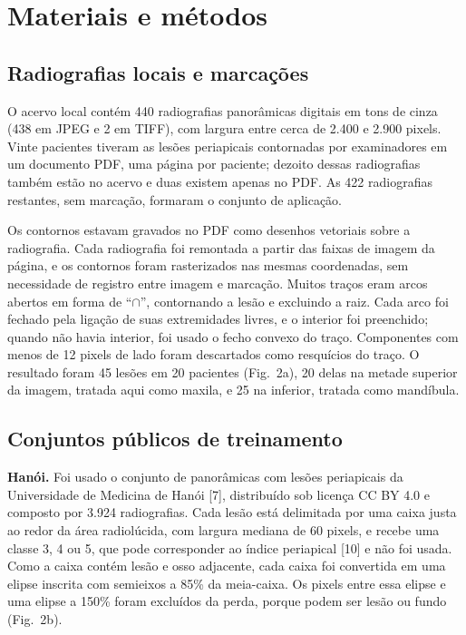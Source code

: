 \documentclass[twocolumn]{article}
\begin{document}

\section{Materiais e métodos}

\subsection{Radiografias locais e marcações}

O acervo local contém 440 radiografias panorâmicas digitais em tons de cinza (438 em JPEG e 2 em TIFF), com largura entre cerca de 2.400 e 2.900 pixels. Vinte pacientes tiveram as lesões periapicais contornadas por examinadores em um documento PDF, uma página por paciente; dezoito dessas radiografias também estão no acervo e duas existem apenas no PDF. As 422 radiografias restantes, sem marcação, formaram o conjunto de aplicação.

Os contornos estavam gravados no PDF como desenhos vetoriais sobre a radiografia. Cada radiografia foi remontada a partir das faixas de imagem da página, e os contornos foram rasterizados nas mesmas coordenadas, sem necessidade de registro entre imagem e marcação. Muitos traços eram arcos abertos em forma de ``$\cap$'', contornando a lesão e excluindo a raiz. Cada arco foi fechado pela ligação de suas extremidades livres, e o interior foi preenchido; quando não havia interior, foi usado o fecho convexo do traço. Componentes com menos de 12 pixels de lado foram descartados como resquícios do traço. O resultado foram 45 lesões em 20 pacientes (Fig.~2a), 20 delas na metade superior da imagem, tratada aqui como maxila, e 25 na inferior, tratada como mandíbula.

\subsection{Conjuntos públicos de treinamento}

\textbf{Hanói.} Foi usado o conjunto de panorâmicas com lesões periapicais da Universidade de Medicina de Hanói [7], distribuído sob licença CC BY 4.0 e composto por 3.924 radiografias. Cada lesão está delimitada por uma caixa justa ao redor da área radiolúcida, com largura mediana de 60 pixels, e recebe uma classe 3, 4 ou 5, que pode corresponder ao índice periapical [10] e não foi usada. Como a caixa contém lesão e osso adjacente, cada caixa foi convertida em uma elipse inscrita com semieixos a 85\% da meia-caixa. Os pixels entre essa elipse e uma elipse a 150\% foram excluídos da perda, porque podem ser lesão ou fundo (Fig.~2b).
\end{document}
